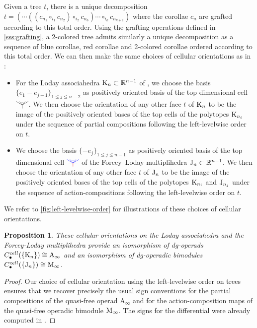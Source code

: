 \documentclass[twoside, 12pt]{amsart}
\newtheorem{proposition}[definition]{Proposition}
\theoremstyle{remark}
\begin{document}
Given a tree $t$, there is a unique decomposition $t=(\cdots ((c_{n_1} \circ_{i_1} c_{n_2})\circ_{i_2}c_{n_3})\cdots \circ_{i_k} c_{n_{k+1}})$ where the corollae $c_n$ are grafted according to this total order. Using the grafting operations defined in \cref{sss:grafting}, a 2-colored tree admits similarly a unique decomposition as a sequence of blue corollae, red corollae and 2-colored corollae ordered according to this total order. 
We can then make the same choices of cellular orientations as in \cite[I, Section 4]{Mazuir21} :
\begin{itemize}
  \item For the Loday associahedra $\mathrm{K}_n \subset \mathbb{R}^{n-1}$ of \cite{MTTV19}, we choose the basis $\{e_1 - e_{j+1}\}_{1\leq j \leq n-2}$ as positively oriented basis of the top dimensional cell $\arbreop{0.15}$. We then choose the orientation of any other face $t$ of $\mathrm{K}_n$ to be the image of the positively oriented bases of the top cells of the polytopes $\mathrm{K}_{n_i}$ under the sequence of partial compositions following the left-levelwise order on $t$. 
  \item We choose the basis $\{- e_j\}_{1\leq j \leq n-1}$ as positively oriented basis of the top dimensional cell $\arbreopmorph{0.15}$ of the Forcey--Loday multiplihedra $\mathrm{J}_n \subset \mathbb{R}^{n-1}$. We then choose the orientation of any other face $t$ of $\mathrm{J}_n$ to be the image of the positively oriented bases of the top cells of the polytopes $\mathrm{K}_{n_i}$ and $\mathrm{J}_{n_j}$ under the sequence of action-compositions following the left-levelwise order on $t$.
\end{itemize}
We refer to \ref{fig:left-levelwise-order} for illustrations of these choices of cellular orientations.

\begin{proposition} 
\label{prop:functoriality}
These cellular orientations on the Loday associahedra and the Forcey-Loday multiplihedra provide an isomorphism of dg-operads $C_\bullet^{cell}(\{\mathrm{K}_n\})\cong \mathrm{A}_\infty$ and an isomorphism of dg-operadic bimodules $C_\bullet^{cell}(\{\mathrm{J}_n\})\cong \mathrm{M}_\infty$. 
\end{proposition}

\begin{proof}
Our choice of cellular orientation using the left-levelwise order on trees ensures that we recover precisely the usual sign conventions for the partial compositions of the quasi-free operad $\mathrm{A}_\infty$ and for the action-composition maps of the quasi-free operadic bimodule $\mathrm{M}_\infty$. 
The signs for the differential were already computed in \cite[I, Section 4]{Mazuir21}.
\end{proof}
\end{document}
